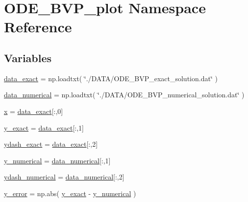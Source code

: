 \hypertarget{namespaceODE__BVP__plot}{}\section{O\+D\+E\+\_\+\+B\+V\+P\+\_\+plot Namespace Reference}
\label{namespaceODE__BVP__plot}
\subsection*{Variables}
\begin{DoxyCompactItemize}
\item 
\hyperlink{namespaceODE__BVP__plot_a622c61e641f1695a3b9cc06bed3fbb3e}{data\+\_\+exact} = np.\+loadtxt( \char`\"{}./D\+A\+TA/O\+D\+E\+\_\+\+B\+V\+P\+\_\+exact\+\_\+solution.\+dat\char`\"{} )
\item 
\hyperlink{namespaceODE__BVP__plot_ad4ab2d9ae63df8f94362a1abefb1b540}{data\+\_\+numerical} = np.\+loadtxt( \char`\"{}./D\+A\+TA/O\+D\+E\+\_\+\+B\+V\+P\+\_\+numerical\+\_\+solution.\+dat\char`\"{} )
\item 
\hyperlink{namespaceODE__BVP__plot_a466900eb1eeddc06d487396821e1e00f}{x} = \hyperlink{namespaceODE__BVP__plot_a622c61e641f1695a3b9cc06bed3fbb3e}{data\+\_\+exact}\mbox{[}\+:,0\mbox{]}
\item 
\hyperlink{namespaceODE__BVP__plot_af37cba4830d7dec912ee2028d4d32f54}{y\+\_\+exact} = \hyperlink{namespaceODE__BVP__plot_a622c61e641f1695a3b9cc06bed3fbb3e}{data\+\_\+exact}\mbox{[}\+:,1\mbox{]}
\item 
\hyperlink{namespaceODE__BVP__plot_a391db2f2f7f3511be763c10ed7451340}{ydash\+\_\+exact} = \hyperlink{namespaceODE__BVP__plot_a622c61e641f1695a3b9cc06bed3fbb3e}{data\+\_\+exact}\mbox{[}\+:,2\mbox{]}
\item 
\hyperlink{namespaceODE__BVP__plot_a2c83010c60bfd7d0f8d05c96300c8a5f}{y\+\_\+numerical} = \hyperlink{namespaceODE__BVP__plot_ad4ab2d9ae63df8f94362a1abefb1b540}{data\+\_\+numerical}\mbox{[}\+:,1\mbox{]}
\item 
\hyperlink{namespaceODE__BVP__plot_a321cad715aaa19b55082e3163d7cf2ee}{ydash\+\_\+numerical} = \hyperlink{namespaceODE__BVP__plot_ad4ab2d9ae63df8f94362a1abefb1b540}{data\+\_\+numerical}\mbox{[}\+:,2\mbox{]}
\item 
\hyperlink{namespaceODE__BVP__plot_a8db68424e12aa3dfa6fd2c118cba6e7c}{y\+\_\+error} = np.\+abs( \hyperlink{namespaceODE__BVP__plot_af37cba4830d7dec912ee2028d4d32f54}{y\+\_\+exact} -\/ \hyperlink{namespaceODE__BVP__plot_a2c83010c60bfd7d0f8d05c96300c8a5f}{y\+\_\+numerical} )

\end{DoxyCompactItemize}
